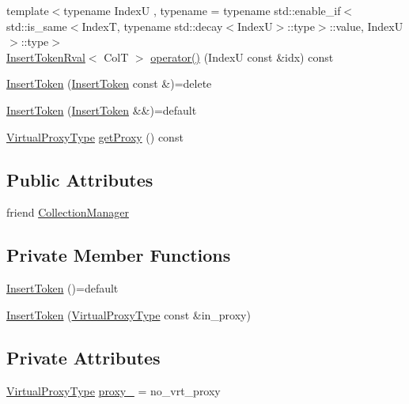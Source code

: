 \begin{DoxyCompactItemize}
\item 
{\footnotesize template$<$typename IndexU , typename  = typename std\+::enable\+\_\+if$<$      std\+::is\+\_\+same$<$\+Index\+T, typename std\+::decay$<$\+Index\+U$>$\+::type$>$\+::value, Index\+U    $>$\+::type$>$ }\\\hyperlink{structvt_1_1vrt_1_1collection_1_1_insert_token_rval}{Insert\+Token\+Rval}$<$ ColT $>$ \hyperlink{structvt_1_1vrt_1_1collection_1_1_insert_token_a3f68c2bd0aecfe50588f8cfc14ecfa4f}{operator()} (IndexU const \&idx) const
\item 
\hyperlink{structvt_1_1vrt_1_1collection_1_1_insert_token_a4adbc8942df683af9d99216c7d2a40d1}{Insert\+Token} (\hyperlink{structvt_1_1vrt_1_1collection_1_1_insert_token}{Insert\+Token} const \&)=delete
\item 
\hyperlink{structvt_1_1vrt_1_1collection_1_1_insert_token_a69f1ea2a33fab61d960c39da57fc0486}{Insert\+Token} (\hyperlink{structvt_1_1vrt_1_1collection_1_1_insert_token}{Insert\+Token} \&\&)=default
\item 
\hyperlink{namespacevt_a1b417dd5d684f045bb58a0ede70045ac}{Virtual\+Proxy\+Type} \hyperlink{structvt_1_1vrt_1_1collection_1_1_insert_token_a41b45da02fd476f5a5a1a57f69f7b17e}{get\+Proxy} () const
\end{DoxyCompactItemize}
\subsection*{Public Attributes}
\begin{DoxyCompactItemize}
\item 
friend \hyperlink{structvt_1_1vrt_1_1collection_1_1_insert_token_a42b6dc06fe8e840dd6ad6c9254b937c3}{Collection\+Manager}
\end{DoxyCompactItemize}
\subsection*{Private Member Functions}
\begin{DoxyCompactItemize}
\item 
\hyperlink{structvt_1_1vrt_1_1collection_1_1_insert_token_afd6ad3de1a56731cfb368fab1c1c5c89}{Insert\+Token} ()=default
\item 
\hyperlink{structvt_1_1vrt_1_1collection_1_1_insert_token_afe7a118bb642d9d7af7be61240672630}{Insert\+Token} (\hyperlink{namespacevt_a1b417dd5d684f045bb58a0ede70045ac}{Virtual\+Proxy\+Type} const \&in\+\_\+proxy)
\end{DoxyCompactItemize}
\subsection*{Private Attributes}
\begin{DoxyCompactItemize}
\item 
\hyperlink{namespacevt_a1b417dd5d684f045bb58a0ede70045ac}{Virtual\+Proxy\+Type} \hyperlink{structvt_1_1vrt_1_1collection_1_1_insert_token_ac809490fd2affc800cbf1eb31fced9a1}{proxy\+\_\+} = no\+\_\+vrt\+\_\+proxy
\end{DoxyCompactItemize}


